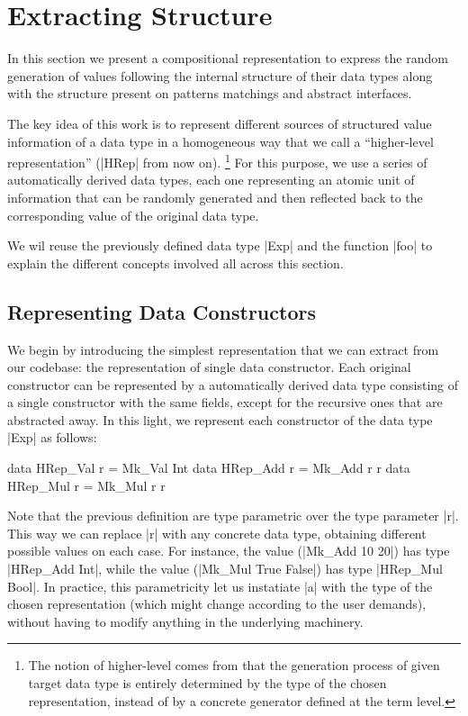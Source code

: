 \section{Extracting Structure} \label{sec:hrep}

In this section we present a compositional representation to express the random
generation of values following the internal structure of their data types along
with the structure present on patterns matchings and abstract interfaces.


The key idea of this work is to represent different sources of structured value
information of a data type in a homogeneous way that we call a ``higher-level
representation'' (|HRep| from now on).%
\footnote{The notion of higher-level comes from that the generation process of
  given target data type is entirely determined by the type of the chosen
  representation, instead of by a concrete generator defined at the term level.}
%
For this purpose, we use a series of automatically derived data types, each one
representing an atomic unit of information that can be randomly generated and
then reflected back to the corresponding value of the original data type.


We wil reuse the previously defined data type |Exp| and the function |foo| to
explain the different concepts involved all across this section.


\subsection{\textbf{Representing Data Constructors}}

We begin by introducing the simplest representation that we can extract from our
codebase: the representation of single data constructor.
%
Each original constructor can be represented by a automatically derived data
type consisting of a single constructor with the same fields, except for the
recursive ones that are abstracted away.
%
In this light, we represent each constructor of the data type |Exp| as follows:

\begin{code}
data HRep_Val  r = Mk_Val Int
data HRep_Add  r = Mk_Add r r
data HRep_Mul  r = Mk_Mul r r
\end{code}

Note that the previous definition are type parametric over the type parameter
|r|.
%
This way we can replace |r| with any concrete data type, obtaining different
possible values on each case.
%
For instance, the value (|Mk_Add 10 20|) has type |HRep_Add Int|, while the
value (|Mk_Mul True False|) has type |HRep_Mul Bool|.
%
In practice, this parametricity let us instatiate |a| with the type of the
chosen representation (which might change according to the user demands),
without having to modify anything in the underlying machinery.


